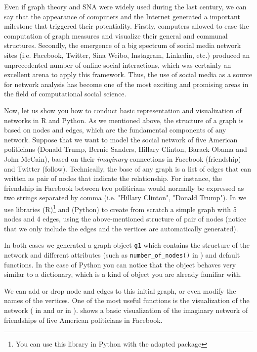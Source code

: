 Even if graph theory and SNA were widely used during the last century, we can say that the appearance of computers and the Internet generated a important milestone that triggered their potentiality. Firstly, computers allowed to ease the computation of graph measures and visualize their general and communal structures. Secondly, the emergence of a big spectrum of social media network sites (i.e. Facebook, Twitter, Sina Weibo, Instagram, Linkedin, etc.) produced an unprecedented number of online social interactions, which was certainly an excellent arena to apply this framework. Thus, the use of social media as a source for network analysis has become one of the most exciting and promising areas in the field of computational social science.

Now, let us show you how to conduct basic representation and visualization of networks in R and Python. As we mentioned above, the structure of a graph is based on nodes and edges, which are the fundamental components of any network. Suppose that we want to model the social network of five American politicians (Donald Trump, Bernie Sanders, Hillary Clinton, Barack Obama and John McCain), based on their \textit{imaginary} connections in Facebook (friendship) and Twitter (follow). Technically, the base of any graph is a list of edges that can written as pair of nodes that indicate 	the relationship.  For instance, the friendship in Facebook between two politicians would normally be expressed as two strings separated by comma (i.e. "Hillary Clinton", "Donald Trump"). In  we use libraries  (R)\footnote{You can use this library in Python with the adapted package }  and  (Python) to create from scratch a simple graph with 5 nodes and 4 edges, using the above-mentioned structure of pair of nodes (notice that we only include the edges and the vertices are automatically generated).


In both cases we generated a graph object \texttt{g1} which contains the structure of the network and different attributes (such as \verb|number_of_nodes()| in 	) and default functions. In the case of Python you can notice that the  object behaves very similar to a dictionary, which is a kind of object you are already familiar with.

We can add or drop node and edges to this initial graph, or even modify the names of the vertices. One of the most useful functions is the visualization of the network ( in  and  or  in ).  shows a basic visualization of the imaginary network of friendships of five American politicians in Facebook.

